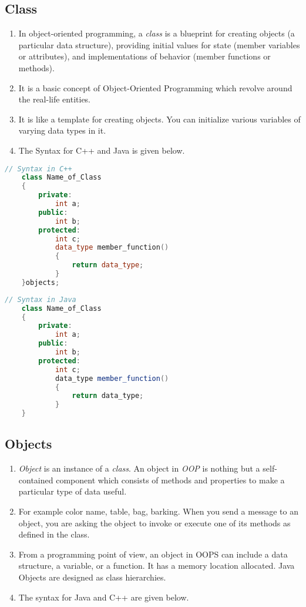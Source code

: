 \documentclass[11pt]{article}
\begin{document}
\subsection{Class}
\begin{enumerate}
	\item In object-oriented programming, a \textit{class} is a blueprint for creating objects (a particular data structure), providing initial values for state (member variables or attributes), and implementations of behavior (member functions or methods).
	\item It is a basic concept of Object-Oriented Programming which revolve around the real-life entities. 
	\item It is like a template for creating objects. You can initialize various variables of varying data types in it.
	\item The Syntax for C++ and Java is given below. 
\end{enumerate}

\begin{lstlisting}[language = C++]
	// Syntax in C++
	class Name_of_Class
	{
		private: 
			int a;
		public: 
			int b;
		protected: 
			int c;
			data_type member_function()
			{
				return data_type;
			}
	}objects;
\end{lstlisting}


\begin{lstlisting}[language = java]
	// Syntax in Java
	class Name_of_Class
	{
		private: 
			int a;
		public: 
			int b;
		protected: 
			int c;
			data_type member_function()
			{
				return data_type;
			}
	}
\end{lstlisting}

\subsection{Objects}


\begin{enumerate}
	\item \textit{Object} is an instance of a \textit{class}. An object in \textit{OOP} is nothing but a self-contained component which consists of methods and properties to make a particular type of data useful. 
	\item For example color name, table, bag, barking. When you send a message to an object, you are asking the object to invoke or execute one of its methods as defined in the class.
	\item From a programming point of view, an object in OOPS can include a data structure, a variable, or a function. It has a memory location allocated. Java Objects are designed as class hierarchies.
	\item The syntax for Java and C++ are given below. 
\end{enumerate}
\end{document}
